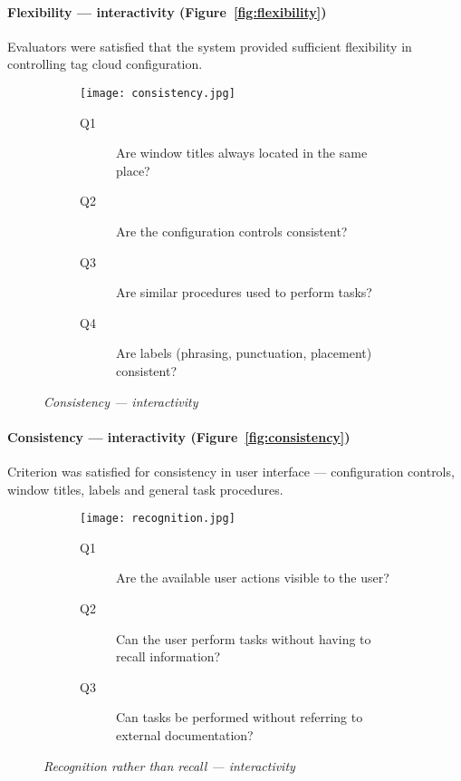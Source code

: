 \paragraph{Flexibility --- interactivity (Figure~\vref{fig:flexibility})}

Evaluators were satisfied that the system provided sufficient flexibility in controlling tag cloud configuration.

\begin{figure}[!htb]
\centering
\begin{subfigure}{\textwidth}
	\centering
	\texttt{[image: consistency.jpg]}
\end{subfigure}
\begin{subfigure}{\textwidth}
  \begin{description}
	\item[Q1]Are window titles always located in the same place?
	\item[Q2]Are the configuration controls consistent?
	\item[Q3]Are similar procedures used to perform tasks?
	\item[Q4]Are labels (phrasing, punctuation, placement) consistent?
  \end{description}
\end{subfigure}
\caption{\textit{Consistency --- interactivity}}
\label{fig:consistency}
\end{figure}

\paragraph{Consistency --- interactivity (Figure~\vref{fig:consistency})}

Criterion was satisfied for consistency in user interface --- configuration controls, window titles, labels and general task procedures. 

\begin{figure}[!htb]
\centering
\begin{subfigure}{.5\textwidth}
	\centering
	\texttt{[image: recognition.jpg]}
\end{subfigure}%
\begin{subfigure}{.5\textwidth}
  \begin{description}
	\item[Q1]Are the available user actions visible to the user?
	\item[Q2]Can the user perform tasks without having to recall information?
	\item[Q3]Can tasks be performed without referring to external documentation?
  \end{description}
\end{subfigure}
\caption{\textit{Recognition rather than recall --- interactivity}}
\label{fig:recognition}
\end{figure}

